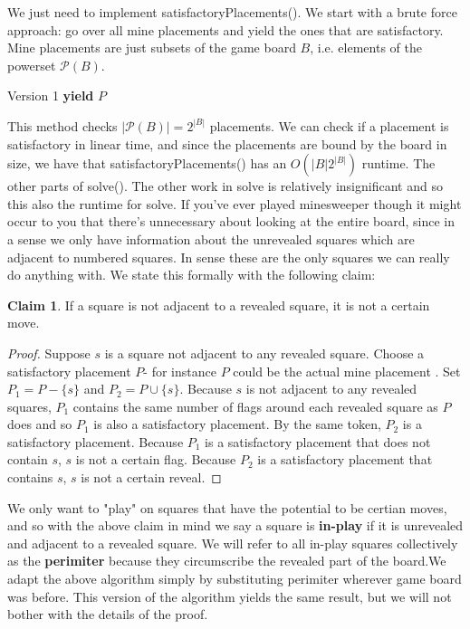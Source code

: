 \documentclass{article}
\theoremstyle{definition}
\theoremstyle{definition}
\theoremstyle{theorem}
\newtheorem*{claim}{Claim}
\begin{document}
	We just need to implement satisfactoryPlacements(). We start with a brute force approach: go over all mine placements and yield the ones that are satisfactory. Mine placements are just subsets of the game board $B$, i.e. elements of the powerset $\mathcal{P}(B)$.
	
	\begin{algorithmic}
		 \Comment Version 1
		\State \textbf{yield} $P$
		\EndIf
		\EndFor
		\EndFunction
	\end{algorithmic}
	
	This method checks $|\mathcal{P}(B)| = 2^{|B|}$ placements. We can check if a placement is satisfactory in linear time, and since the placements are bound by the board in size, we have that satisfactoryPlacements() has an $O(|B|2^{|B|})$ runtime. The other parts of solve(). The other work in solve is relatively insignificant and so this also the runtime for solve. If you've ever played minesweeper though it might occur to you that there's unnecessary about looking at the entire board, since in a sense we only have information about the unrevealed squares which are adjacent to numbered squares. In sense these are the only squares we can really do anything with. We state this formally with the following claim:
	\begin{claim}
		If a square is not adjacent to a revealed square, it is not a certain move.
	\end{claim}
	\begin{proof}
		Suppose $s$ is a square not adjacent to any revealed square. Choose a satisfactory placement $P$- for instance $P$ could be the actual mine placement . Set $P_1 = P - \{s\}$ and $P_2 = P \cup \{s\}$. Because $s$ is not adjacent to any revealed squares, $P_1$ contains the same number of flags around each revealed square as $P$ does and so $P_1$ is also a satisfactory placement. By the same token, $P_2$ is a satisfactory placement. Because $P_1$ is a satisfactory placement that does not contain $s$, $s$ is not a certain flag. Because $P_2$ is a satisfactory placement that contains $s$, $s$ is not a certain reveal.
	\end{proof}
	We only want to "play" on squares that have the potential to be certian moves, and so with the above claim in mind we say a square is \textbf{in-play} if it is unrevealed and adjacent to a revealed square. We will refer to all in-play squares collectively as the \textbf{perimiter} because they circumscribe the revealed part of the board.We adapt the above algorithm simply by substituting perimiter wherever game board was before. This version of the algorithm yields the same result, but we will not bother with the details of the proof.
	
\end{document}
